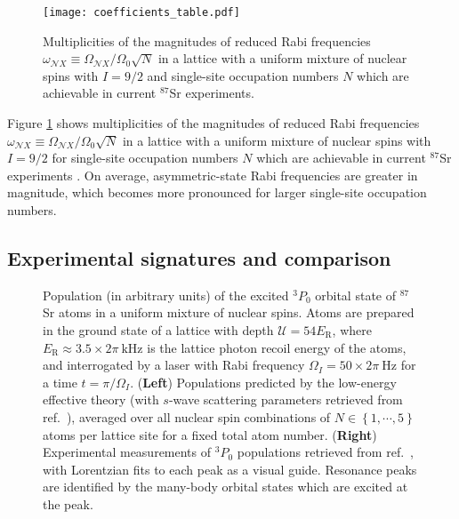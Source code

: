 \documentclass[preprint,showkeys,nofootinbib]{revtex4-1}
\renewcommand{\t}{\text} %
\renewcommand{\set}[1]{\left\{#1\right\}} %
\newcommand{\N}{\mathcal{N}}
\newcommand{\U}{\mathcal{U}}
\newcommand{\1}{\mathds{1}}
\begin{document}
\begin{figure}
  \centering
  \texttt{[image: coefficients\_table.pdf]}
  \caption{\footnotesize Multiplicities of the magnitudes of reduced
    Rabi frequencies
    $\omega_{\N X}\equiv\Omega_{\N X}/\Omega_0\sqrt{N}$ in a lattice
    with a uniform mixture of nuclear spins with $I=9/2$ and
    single-site occupation numbers $N$ which are achievable in current
    ${}^{87}$Sr experiments.}
  \label{fig:coefficients}
\end{figure}

Figure \ref{fig:coefficients} shows multiplicities of the magnitudes
of reduced Rabi frequencies
$\omega_{\N X}\equiv\Omega_{\N X}/\Omega_0\sqrt{N}$ in a lattice with
a uniform mixture of nuclear spins with $I=9/2$ for single-site
occupation numbers $N$ which are achievable in current ${}^{87}$Sr
experiments \cite{goban2018emergence}.  On average, asymmetric-state
Rabi frequencies are greater in magnitude, which becomes more
pronounced for larger single-site occupation numbers.


\subsection{Experimental signatures and comparison}

\begin{figure}
  \centering
  \caption{\footnotesize Population (in arbitrary units) of the
    excited ${}^3P_0$ orbital state of ${}^{87}$Sr atoms in a uniform
    mixture of nuclear spins.  Atoms are prepared in the ground state
    of a lattice with depth $\U=54 E_{\t{R}}$, where
    $E_{\t{R}}\approx3.5\times2\pi~\t{kHz}$ is the lattice photon
    recoil energy of the atoms, and interrogated by a laser with Rabi
    frequency $\Omega_I=50\times2\pi~\t{Hz}$ for a time
    $t=\pi/\Omega_I$.  ({\bf Left}) Populations predicted by the
    low-energy effective theory (with $s$-wave scattering parameters
    retrieved from ref.~\cite{zhang2014spectroscopic}), averaged over
    all nuclear spin combinations of $N\in\set{1,\cdots,5}$ atoms per
    lattice site for a fixed total atom number.  ({\bf Right})
    Experimental measurements of ${}^3P_0$ populations retrieved from
    ref.~\cite{goban2018emergence}, with Lorentzian fits to each peak
    as a visual guide.  Resonance peaks are identified by the
    many-body orbital states which are excited at the
    peak.}
  \label{fig:sweep}
\end{figure}
\end{document}
